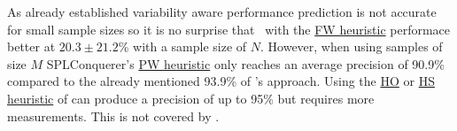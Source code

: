 As already established variability aware performance prediction is not accurate for small sample sizes so it is no surprise that \AFID~with the \hyperref[lab:FW]{FW heuristic} performace better at $20.3\pm21.2$\% with a sample size of $N$. However, when using samples of size $M$ SPLConquerer's \hyperref[lab:PW]{PW heuristic} only reaches an average precision of 90.9\% compared to the already mentioned 93.9\% of \citet{VariabilityAwarePerformancePredictionJianmeiSigmundApel}'s approach.
Using the \hyperref[lab:HO]{HO} or \hyperref[lab:HS]{HS heuristic} of \AFID can produce a precision of up to 95\% but requires more measurements. This is not covered by \cite{VariabilityAwarePerformancePredictionJianmeiSigmundApel}.
